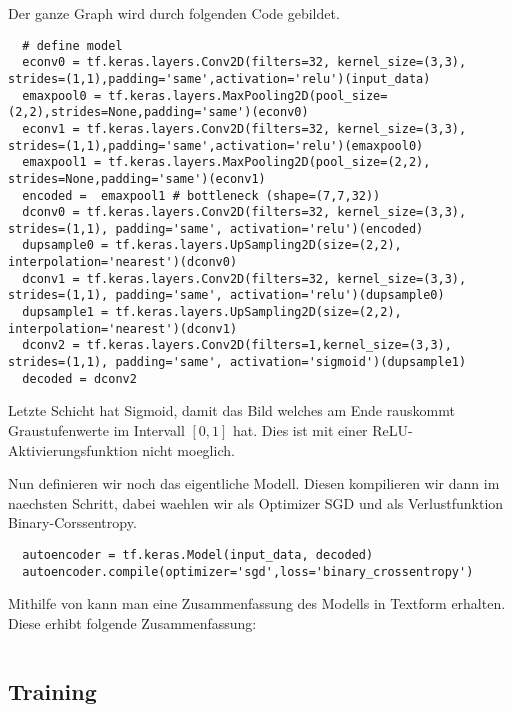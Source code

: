 Der ganze Graph wird durch folgenden Code gebildet.
\begin{verbatim}
  # define model
  econv0 = tf.keras.layers.Conv2D(filters=32, kernel_size=(3,3), strides=(1,1),padding='same',activation='relu')(input_data)
  emaxpool0 = tf.keras.layers.MaxPooling2D(pool_size=(2,2),strides=None,padding='same')(econv0)
  econv1 = tf.keras.layers.Conv2D(filters=32, kernel_size=(3,3), strides=(1,1),padding='same',activation='relu')(emaxpool0)
  emaxpool1 = tf.keras.layers.MaxPooling2D(pool_size=(2,2), strides=None,padding='same')(econv1)
  encoded =  emaxpool1 # bottleneck (shape=(7,7,32))
  dconv0 = tf.keras.layers.Conv2D(filters=32, kernel_size=(3,3), strides=(1,1), padding='same', activation='relu')(encoded)
  dupsample0 = tf.keras.layers.UpSampling2D(size=(2,2), interpolation='nearest')(dconv0)
  dconv1 = tf.keras.layers.Conv2D(filters=32, kernel_size=(3,3), strides=(1,1), padding='same', activation='relu')(dupsample0)
  dupsample1 = tf.keras.layers.UpSampling2D(size=(2,2), interpolation='nearest')(dconv1)
  dconv2 = tf.keras.layers.Conv2D(filters=1,kernel_size=(3,3), strides=(1,1), padding='same', activation='sigmoid')(dupsample1)
  decoded = dconv2
\end{verbatim}
Letzte Schicht hat Sigmoid, damit das Bild welches am Ende rauskommt
Graustufenwerte im Intervall $[0,1]$ hat. Dies ist mit einer
ReLU-Aktivierungsfunktion nicht moeglich.

Nun definieren wir noch das eigentliche Modell.
Diesen kompilieren wir dann im naechsten Schritt, dabei waehlen wir als
Optimizer SGD und als Verlustfunktion Binary-Corssentropy.
\begin{verbatim}
  autoencoder = tf.keras.Model(input_data, decoded)
  autoencoder.compile(optimizer='sgd',loss='binary_crossentropy')
\end{verbatim}

Mithilfe von  kann man eine Zusammenfassung des
Modells in Textform erhalten. Diese erhibt folgende Zusammenfassung:
\begin{verbatim}
\end{verbatim}



\subsection{Training}
\begin{verbatim}

\end{verbatim}

